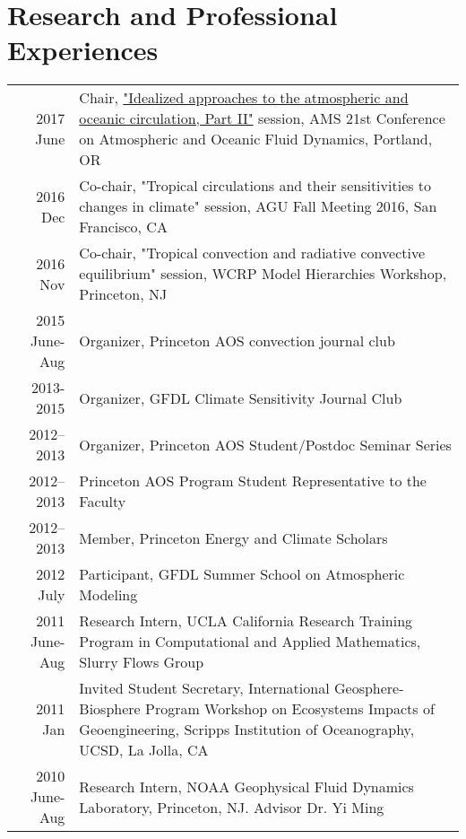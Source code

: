 \documentclass[12pt,letterpaper]{shillcv}
\begin{document}
\section*{Research and Professional Experiences}
\label{sec:org6f89f5d}
\begin{center}
\begin{tabularx}{\textwidth}{rX}
2017 June & Chair, \href{https://ams.confex.com/ams/21Fluid19Middle/webprogram/Session43327.html}{"Idealized approaches to the atmospheric and oceanic circulation, Part II"} session, AMS 21st Conference on Atmospheric and Oceanic Fluid Dynamics, Portland, OR\\
2016 Dec & Co-chair, "Tropical circulations and their sensitivities to changes in climate" session, AGU Fall Meeting 2016, San Francisco, CA\\
2016 Nov & Co-chair, "Tropical convection and radiative convective equilibrium" session, WCRP Model Hierarchies Workshop, Princeton, NJ\\
2015 June-Aug & Organizer, Princeton AOS convection journal club\\
2013-2015 & Organizer, GFDL Climate Sensitivity Journal Club\\
2012–2013 & Organizer, Princeton AOS Student/Postdoc Seminar Series\\
2012–2013 & Princeton AOS Program Student Representative to the Faculty\\
2012–2013 & Member, Princeton Energy and Climate Scholars\\
2012 July & Participant, GFDL Summer School on Atmospheric Modeling\\
2011 June-Aug & Research Intern, UCLA California Research Training Program in Computational and Applied Mathematics, Slurry Flows Group\\
2011 Jan & Invited Student Secretary, International Geosphere-Biosphere Program Workshop on Ecosystems Impacts of Geoengineering, Scripps Institution of Oceanography, UCSD, La Jolla, CA\\
2010 June-Aug & Research Intern, NOAA Geophysical Fluid Dynamics Laboratory, Princeton, NJ. Advisor Dr. Yi Ming\\
\end{tabularx}
\end{center}
\end{document}
